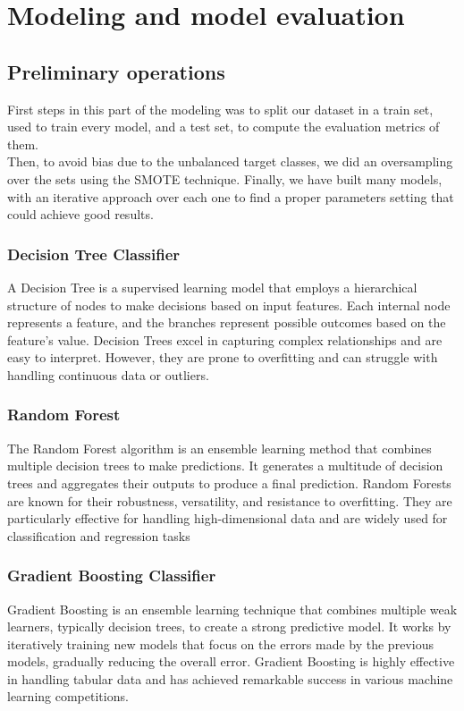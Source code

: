 \chapter{Modeling and model evaluation}
\label{sec:data_preparation}

\section{Preliminary operations}
First steps in this part of the modeling was to split our dataset in a train set, used to train every model, and a test set, to compute the evaluation metrics of them.\\
Then, to avoid bias due to the unbalanced target classes, we did an oversampling over the sets using the SMOTE technique.
Finally, we have built many models, with an iterative approach over each one to find a proper parameters setting that could achieve good results.
\subsection{Decision Tree Classifier}
A Decision Tree is a supervised learning model that employs a hierarchical structure of nodes to make decisions based on input features. Each internal node represents a feature, and the branches represent possible outcomes based on the feature's value. Decision Trees excel in capturing complex relationships and are easy to interpret. However, they are prone to overfitting and can struggle with handling continuous data or outliers.\subsection{Random Forest}
The Random Forest algorithm is an ensemble learning method that combines multiple decision trees to make predictions. It generates a multitude of decision trees and aggregates their outputs to produce a final prediction. Random Forests are known for their robustness, versatility, and resistance to overfitting. They are particularly effective for handling high-dimensional data and are widely used for classification and regression tasks
\subsection{Gradient Boosting Classifier}
Gradient Boosting is an ensemble learning technique that combines multiple weak learners, typically decision trees, to create a strong predictive model. It works by iteratively training new models that focus on the errors made by the previous models, gradually reducing the overall error. Gradient Boosting is highly effective in handling tabular data and has achieved remarkable success in various machine learning competitions.

